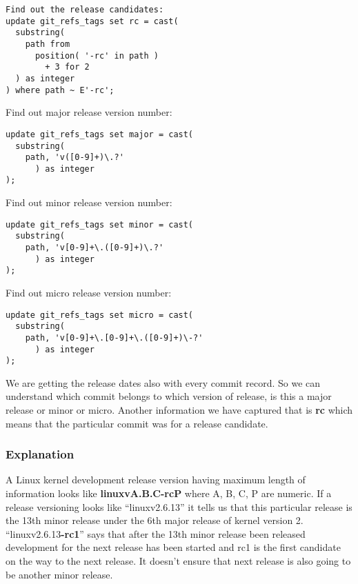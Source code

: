 \documentclass{acm_proc_article-sp}
\begin{document}
\begin{lstlisting}
Find out the release candidates:
update git_refs_tags set rc = cast(
  substring(
    path from
      position( '-rc' in path )
        + 3 for 2 
  ) as integer
) where path ~ E'-rc';
\end{lstlisting}
Find out major release version number:
\begin{lstlisting}
update git_refs_tags set major = cast(
  substring(
    path, 'v([0-9]+)\.?'
      ) as integer
);
\end{lstlisting}
Find out minor release version number:
\begin{lstlisting}
update git_refs_tags set minor = cast(
  substring(
    path, 'v[0-9]+\.([0-9]+)\.?'
      ) as integer
);
\end{lstlisting}
Find out micro release version number:
\begin{lstlisting}
update git_refs_tags set micro = cast(
  substring(
    path, 'v[0-9]+\.[0-9]+\.([0-9]+)\-?'
      ) as integer
);
\end{lstlisting}

We are getting the release dates also with every commit record. So we can understand which commit belongs to which version of release, is this a major release or minor or micro. Another information we have captured that is \textbf{rc} which means that the particular commit was for a release candidate.

\subsubsection{Explanation}
A Linux kernel development release version having maximum length of information looks like \textbf{linuxvA.B.C-rcP} where A, B, C, P are numeric. If a release versioning looks like ``linuxv2.6.13'' it tells us that this particular release is the 13th minor release  under  the 6th major release of kernel version 2. ``linuxv2.6.13\textbf{-rc1}'' says that after the 13th minor release been released development for the next release has been started and rc1 is the first candidate on the way to the next release. It doesn't ensure that next release is also going to be another minor release.
\end{document}
